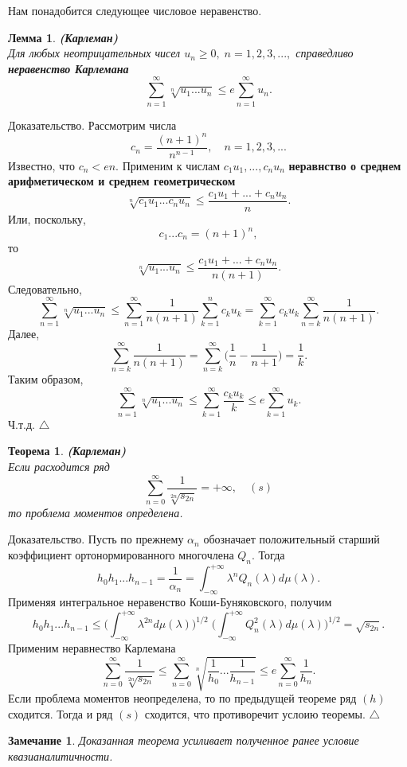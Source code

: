 \documentclass[12 pt, a4 paper]{article}
\theoremstyle{plain}   \newtheorem{Pro}{Задача}
\newtheorem{Rem}{Замечание}
\newtheorem{The}{Теорема}
\newtheorem{Lem}{Лемма}
\begin{document}
Нам понадобится следующее числовое неравенство.
\begin{Lem}
{\bfseries (Карлеман)}
\\
Для любых неотрицательных чисел
$ u_n \geq 0, \; n=1,2,3,..., $
справедливо
{\bfseries неравенство Карлемана}
$$
  \sum _{n=1}^{\infty}
  \sqrt[n]{u_1 ...u_n } \leq e
  \sum _{n=1}^{\infty} u_n .
$$
\end{Lem}
{\Large Доказательство.}
Рассмотрим числа
$$
  c_n =\frac{(n+1)^n}{n^{n-1}}, \quad n=1,2,3,...
$$
Известно, что
$ c_n <en. $
Применим к числам
$ c_1 u_1 ,...,c_n u_n $
{\bfseries неравнство о среднем арифметическом и среднем геометрическом}
$$
  \sqrt[n]{c_1 u_1 ...c_n u_n } \leq
  \frac{c_1 u_1 +...+c_n u_n }{n}.
$$
Или, поскольку,
$$
  c_1 ...c_n =(n+1)^n ,
$$
то
$$
 \sqrt[n]{u_1 ...u_n} \leq
 \frac{c_1 u_1 +...+c_n u_n}{n(n+1)}.
$$
Следовательно,
$$
  \sum _{n=1}^{\infty}\sqrt[n]{u_1 ...u_n} \leq
  \sum _{n=1}^{\infty} \frac{1}{n(n+1)}
  \sum _{k=1}^n c_k u_k =
  \sum _{k=1}^{\infty} c_k u_k
  \sum _{n=k}^{\infty} \frac{1}{n(n+1)}.
$$
Далее,
$$
  \sum _{n=k}^{\infty} \frac{1}{n(n+1)}=
  \sum _{n=k}^{\infty} \biggl ( \frac{1}{n}-
  \frac{1}{n+1} \biggr ) =\frac{1}{k} .
$$
Таким образом,
$$
  \sum _{n=1}^{\infty} \sqrt[n]{u_1 ...u_n} \leq
  \sum _{k=1}^{\infty}\frac{c_k u_k}{k} \leq
  e \sum _{k=1}^{\infty}u_k .
$$
Ч.т.д.
$ \triangle $
\begin{The}
{\bfseries (Карлеман)}
\\
Если расходится ряд
$$
  \sum _{n=0}^{\infty} \frac{1}{\sqrt[2n]{s_{2n}}}
  =+\infty , \quad (s)
$$
то проблема моментов определена.
\end{The}
{\Large Доказательство.}
Пусть по прежнему
$ \alpha _n $
обозначает положительный старший коэффициент ортонормированного
многочлена
$ Q_n . $
Тогда
$$
  h_0 h_1 ...h_{n-1}=\frac{1}{\alpha _n}=
  \int _{-\infty}^{+\infty}
  \lambda ^n Q_n (\lambda )d\mu (\lambda ).
$$
Применяя интегральное неравенство Коши-Буняковского, получим
$$
  h_0 h_1 ...h_{n-1} \leq
  \Biggl ( \int _{-\infty}^{+\infty}
  \lambda ^{2n}d\mu (\lambda ) \Biggr ) ^{1/2} \;
  \Biggl ( \int _{-\infty}^{+\infty}
  Q_n ^2 (\lambda )d\mu (\lambda ) \Biggr ) ^{1/2}
  =\sqrt{s_{2n}}.
$$
Применим неравнество Карлемана
$$
  \sum _{n=0}^{\infty} \frac{1}{\sqrt[2n]{s_{2n}}} \leq
  \sum _{n=0}^{\infty} \sqrt[n]{\frac{1}{h_0}...
  \frac{1}{h_{n-1}}} \leq e
  \sum _{n=0}^{\infty} \frac{1}{h_n} .
$$
Если проблема моментов неопределена, то по предыдущей теореме
ряд
$ (h) $
сходится. Тогда и ряд
$ (s) $
сходится, что противоречит услоию теоремы.
$ \triangle $
\begin{Rem}
Доказанная теорема усиливает полученное ранее условие
квазианалитичности.
\end{Rem}
\newpage
\end{document}
